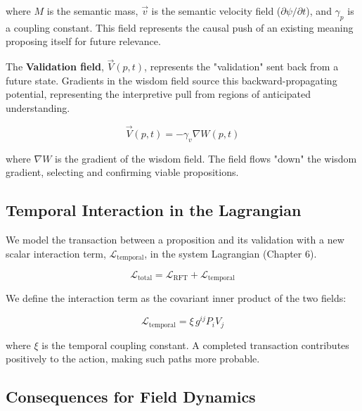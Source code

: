 where \(M\) is the semantic mass, \(\vec{v}\) is the semantic velocity field (\(\partial\psi/\partial t\)), and \(\gamma_p\) is a coupling constant. This field represents the causal push of an existing meaning proposing itself for future relevance.

The \textbf{Validation field}, \(\vec{V}(p,t)\), represents the "validation" sent back from a future state. Gradients in the wisdom field source this backward-propagating potential, representing the interpretive pull from regions of anticipated understanding.

\begin{equation}
\vec{V}(p,t) = -\gamma_v \nabla W(p,t)
\end{equation}

where \(\nabla W\) is the gradient of the wisdom field. The field flows "down" the wisdom gradient, selecting and confirming viable propositions.


\subsection{Temporal Interaction in the Lagrangian}
\label{9.6.3:temporal_interaction_in_the_lagrangian}

We model the transaction between a proposition and its validation with a new scalar interaction term, \(\mathcal{L}_{\text{temporal}}\), in the system Lagrangian (Chapter 6).

\begin{equation}
\mathcal{L}_{\text{total}} = \mathcal{L}_{\text{RFT}} + \mathcal{L}_{\text{temporal}}
\end{equation}

We define the interaction term as the covariant inner product of the two fields:

\begin{equation}
\mathcal{L}_{\text{temporal}} = \xi \, g^{ij} P_{i} V_{j}
\end{equation}

where \(\xi\) is the temporal coupling constant. A completed transaction contributes positively to the action, making such paths more probable.


\subsection{Consequences for Field Dynamics}
\label{9.6.4:consequences_for_field_dynamics}

